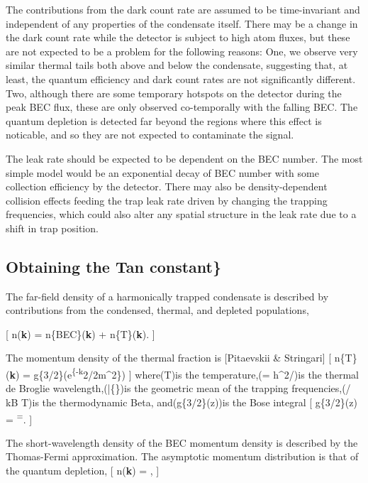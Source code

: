 The contributions from the dark count rate are assumed to be
time-invariant and independent of any properties of the condensate
itself. There may be a change in the dark count rate while the detector
is subject to high atom fluxes, but these are not expected to be a
problem for the following reasons: One, we observe very similar thermal
tails both above and below the condensate, suggesting that, at least,
the quantum efficiency and dark count rates are not significantly
different. Two, although there are some temporary hotspots on the
detector during the peak BEC flux, these are only observed co-temporally
with the falling BEC. The quantum depletion is detected far beyond the
regions where this effect is noticable, and so they are not expected to
contaminate the signal.

The leak rate should be expected to be dependent on the BEC number. The
most simple model would be an exponential decay of BEC number with some
collection efficiency by the detector. There may also be
density-dependent collision effects feeding the trap leak rate driven by
changing the trapping frequencies, which could also alter any spatial
structure in the leak rate due to a shift in trap position.

\hypertarget{obtaining-the-tan-constant}{%
\subsection{Obtaining the Tan
constant\}}\label{obtaining-the-tan-constant}}

The far-field density of a harmonically trapped condensate is described
by contributions from the condensed, thermal, and depleted populations,

{[} n(\textbf{k}) = n\{BEC\}(\textbf{k}) + n\{T\}(\textbf{k}). {]}

The momentum density of the thermal fraction is {[}Pitaevskii \&
Stringari{]} {[} n\{T\}(\textbf{k}) =
g\{3/2\}\left(e\textsuperscript{\{-\beta k}2/2m\hbar\^{}2\}\right) {]}
where(T)is the temperature,(\lambdaT = h\^{}2/)is the
thermal de Broglie wavelength,(\bar\{\omega\})is the geometric mean of
the trapping frequencies,(/ kB T)is the thermodynamic Beta,
and(g\{3/2\}(z))is the Bose integral {[} g\{3/2\}(z) =
\textsuperscript{\infty {}=}\infty {}.
{]}

The short-wavelength density of the BEC momentum density is described by
the Thomas-Fermi approximation. The asymptotic momentum distribution is
that of the quantum depletion, {[} n(\textbf{k}) =
, {]}

